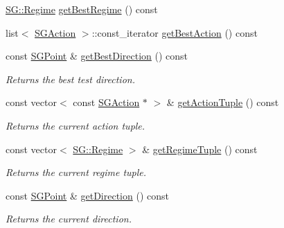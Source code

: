 \begin{DoxyCompactItemize}
\hyperlink{namespaceSG_a139e4dec41ea0f38aae1f93f60cfff60}{S\+G\+::\+Regime} \hyperlink{classSGApprox_a5323e34b4a796d1667d93d6d62e5fe29}{get\+Best\+Regime} () const
\item 
list$<$ \hyperlink{classSGAction}{S\+G\+Action} $>$\+::const\+\_\+iterator \hyperlink{classSGApprox_af8eecb492245be11fc1626acd751b37b}{get\+Best\+Action} () const
\item 
\mbox{\label{classSGApprox_a8b2466a3aa5de71e96e4a120ef044734}} 
const \hyperlink{classSGPoint}{S\+G\+Point} \& \hyperlink{classSGApprox_a8b2466a3aa5de71e96e4a120ef044734}{get\+Best\+Direction} () const
\begin{DoxyCompactList}\small\item\em Returns the best test direction. \end{DoxyCompactList}\item 
\mbox{\label{classSGApprox_ad7911ce5dfbab5b366f2c47bea7463e5}} 
const vector$<$ const \hyperlink{classSGAction}{S\+G\+Action} $\ast$ $>$ \& \hyperlink{classSGApprox_ad7911ce5dfbab5b366f2c47bea7463e5}{get\+Action\+Tuple} () const
\begin{DoxyCompactList}\small\item\em Returns the current action tuple. \end{DoxyCompactList}\item 
\mbox{\label{classSGApprox_a3d54d78a98f1d2567c5c3b21d776d8eb}} 
const vector$<$ \hyperlink{namespaceSG_a139e4dec41ea0f38aae1f93f60cfff60}{S\+G\+::\+Regime} $>$ \& \hyperlink{classSGApprox_a3d54d78a98f1d2567c5c3b21d776d8eb}{get\+Regime\+Tuple} () const
\begin{DoxyCompactList}\small\item\em Returns the current regime tuple. \end{DoxyCompactList}\item 
\mbox{\label{classSGApprox_a54216fb04becc6af77a8a5bf1daab561}} 
const \hyperlink{classSGPoint}{S\+G\+Point} \& \hyperlink{classSGApprox_a54216fb04becc6af77a8a5bf1daab561}{get\+Direction} () const
\begin{DoxyCompactList}\small\item\em Returns the current direction. \end{DoxyCompactList}\item 
\mbox{\label{classSGApprox_ae5b524bc10cf0178c23a95b3795231c7}} 

\end{DoxyCompactItemize}
